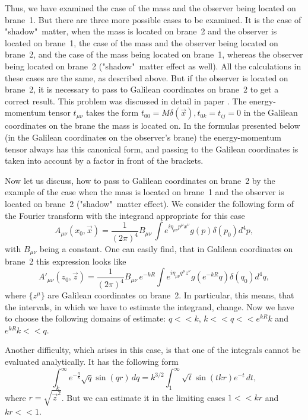 \documentclass[a4paper,12pt]{article}
\begin{document}
Thus, we have examined the case of the mass and the observer being
located on brane~1. But  there are three more  possible cases to
be examined. It is the case  of "shadow"\ matter, when the mass is
located on brane~2 and the observer is located on brane~1, the
case of the mass and the observer being  located on brane~2, and
the case of the  mass being located on brane~1, whereas the
observer being located on brane~2 ("shadow"\ matter effect as
well). All the calculations in these cases are the same, as
described above. But if the  observer is located on brane~2, it is
necessary to pass to Galilean coordinates on brane~2 to get a
correct result. This problem was discussed in detail in paper
\cite{BKSV}. The energy-momentum tensor $t_{\mu\nu}$ takes the
form $t_{00}=M\delta (\vec x ), t_{0k}=t_{ij}=0$ in the Galilean
coordinates on the brane the mass is located on. In the formulas
presented below (in the Galilean coordinates on the observer's
brane) the energy-momentum tensor always has this canonical form,
and passing to the Galilean coordinates is taken into account by a
factor in front of the brackets.

Now let us discuss, how to pass to Galilean coordinates on brane~2
by the example of the case when the mass is located on brane~1 and
the observer is located on brane~2 ("shadow"\ matter effect). We
consider the following form of the Fourier transform with the
integrand   appropriate for this case
\begin{equation}
A_{\mu\nu}(x_0,\vec x)=\frac{1}{(2\pi)^4} B_{\mu\nu} \,\int
e^{i\eta_{\mu\nu}p^{\mu}x^{\nu}}g(p)\delta(p_0) d^{4}p,
\end{equation}
with $B_{\mu\nu}$ being a constant. One can easily find, that
in Galilean coordinates on brane~2 this expression looks like
\begin{equation}
A'_{\mu\nu}(z_0,\vec z)=\frac{1}{(2\pi)^4} B_{\mu\nu}\, e^{-kR}\int
e^{i\eta_{\mu\nu}q^{\mu}z^{\nu}}g(e^{-kR}q)\delta(q_0) d^{4}q,
\end{equation}
where $\{z^{\mu}\}$ are Galilean coordinates on brane~2. In particular,
this means, that the intervals, in which we have to estimate the
integrand, change. Now we have to choose the following domains of
estimate: $q<<k$, $k<<q<<e^{kR}k$ and $e^{kR}k<<q$.

Another difficulty, which arises in this case, is that one of the integrals
cannot be evaluated analytically. It has the following form
\begin{equation}\label{comp}
\int_k^\infty
e^{-\frac{q}{k}}\sqrt{q}\sin(qr)\,dq=k^{3/2}\int_1^\infty
\sqrt{t}\sin(tkr)e^{-t}\,dt,
\end{equation}
where $r=\sqrt{{\vec z}^2}$. But we can estimate it in the
limiting cases $1<<kr$ and $kr<<1$.
\end{document}
